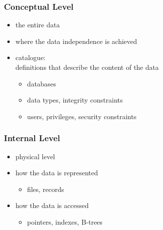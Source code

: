 \documentclass[dvipsnames]{beamer}
\theoremstyle{plain}
\begin{document}
\begin{frame}
  \frametitle{Conceptual Level}

  \begin{itemize}
    \item the entire data
    \item where the data independence is achieved

    \pause
    \bigskip
    \item \alert{catalogue}:\\
      definitions that describe the content of the data

    \begin{itemize}
      \item databases
      \item data types, integrity constraints
      \item users, privileges, security constraints
    \end{itemize}
  \end{itemize}
\end{frame}

\begin{frame}
  \frametitle{Internal Level}

  \begin{itemize}
    \item physical level

    \pause
    \item how the data is represented
    \begin{itemize}
      \item files, records
    \end{itemize}

    \pause
    \item how the data is accessed
    \begin{itemize}
      \item pointers, indexes, B-trees
    \end{itemize}
  \end{itemize}
\end{frame}
\end{document}
